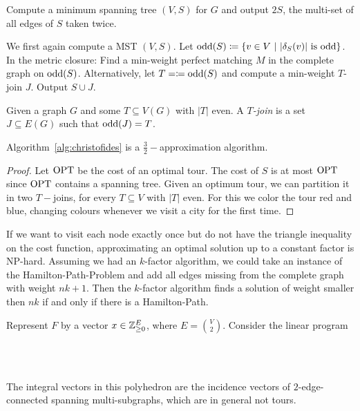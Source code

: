 \documentclass{skript}
\begin{document}
\begin{algo}\label{alg:doubletree}
    Compute a minimum spanning tree $(V,S)$ for $G$ and output $2S$, the multi-set of all edges of $S$ taken twice.
\end{algo}

\begin{algo}\label{alg:christofides}
    We first again compute a MST $(V,S)$.
    Let $\operatorname{odd}(S) \coloneqq \left\{v\in V\ \middle|\  |\delta_S(v)| \text{ is odd}\right\}$.
    In the metric closure: Find a min-weight perfect matching $M$ in the complete graph on $\operatorname{odd}(S)$.
    Alternatively, let $T=\coloneqq \operatorname{odd}(S)$ and compute a min-weight $T$-join $J$. 
    Output $S\cup J$.
\end{algo}

\begin{definition}[$T$-Join]
    Given a graph $G$ and some $T\subseteq V(G)$ with $|T|$ even.
    A \emph{$T$-join} is a set $J\subseteq E(G)$ such that $\operatorname{odd}(J) = T$.
\end{definition}

\begin{thm}\label{thm:christofides}
    Algorithm~\ref{alg:christofides} is a $\frac32-$approximation algorithm.
\end{thm}
\begin{proof}
    Let $\operatorname{OPT}$ be the cost of an optimal tour.
    The cost of $S$ is at most $\operatorname{OPT}$ since $\operatorname{OPT}$ contains a spanning tree.
    Given an optimum tour, we can partition it in two $T-$joins, for every $T\subseteq V$ with $|T|$ even. 
    For this we color the tour red and blue, changing colours whenever we visit a city for the first time.
\end{proof}

\begin{note}
    If we want to visit each node exactly once but do not have the triangle inequality on the cost function, approximating an optimal solution up to a constant factor is NP-hard.
    Assuming we had an $k$-factor algorithm, we could take an instance of the Hamilton-Path-Problem and add all edges missing from the complete graph with weight $nk+1$.
    Then the $k$-factor algorithm finds a solution of weight smaller then $nk$ if and only if there is a Hamilton-Path.
\end{note}

\begin{definition}
    Represent $F$ by a vector $x\in \mathbb{Z}^E_{\geq0}$, where $E=\binom V2$. Consider the linear program
    \begin{linprog}
        \\
        \lpst {}\\
    \end{linprog}
    The integral vectors in this polyhedron are the incidence vectors of $2$-edge-connected spanning multi-subgraphs, which are in general not tours. 
\end{definition}
\end{document}
